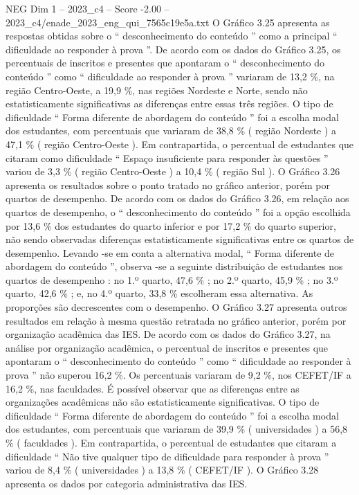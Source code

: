 \begin{textsample}{NEG Dim 1 – 2023\_c4 – Score -2.00 – 2023\_c4/enade\_2023\_eng\_qui\_7565c19e5a.txt}
O Gráfico 3.25 apresenta as respostas obtidas sobre o “ desconhecimento do conteúdo ” como a principal “ dificuldade ao responder à prova ”.
De acordo com os dados do Gráfico 3.25, os percentuais de inscritos e presentes que apontaram o “ desconhecimento do conteúdo ” como “ dificuldade ao responder à prova ” variaram de 13,2 \%, na região Centro-Oeste, a 19,9 \%, nas regiões Nordeste e Norte, sendo não estatisticamente significativas as diferenças entre essas três regiões.
O tipo de dificuldade “ Forma diferente de abordagem do conteúdo ” foi a escolha modal dos estudantes, com percentuais que variaram de 38,8 \% ( região Nordeste ) a 47,1 \% ( região Centro-Oeste ).
Em contrapartida, o percentual de estudantes que citaram como dificuldade “ Espaço insuficiente para responder às questões ” variou de 3,3 \% ( região Centro-Oeste ) a 10,4 \% ( região Sul ).
O Gráfico 3.26 apresenta os resultados sobre o ponto tratado no gráfico anterior, porém por quartos de desempenho.
De acordo com os dados do Gráfico 3.26, em relação aos quartos de desempenho, o “ desconhecimento do conteúdo ” foi a opção escolhida por 13,6 \% dos estudantes do quarto inferior e por 17,2 \% do quarto superior, não sendo observadas diferenças estatisticamente significativas entre os quartos de desempenho.
Levando -se em conta a alternativa modal, “ Forma diferente de abordagem do conteúdo ”, observa -se a seguinte distribuição de estudantes nos quartos de desempenho : no 1.º quarto, 47,6 \% ; no 2.º quarto, 45,9 \% ; no 3.º quarto, 42,6 \% ; e, no 4.º quarto, 33,8 \% escolheram essa alternativa.
As proporções são decrescentes com o desempenho.
O Gráfico 3.27 apresenta outros resultados em relação à mesma questão retratada no gráfico anterior, porém por organização acadêmica das IES.
De acordo com os dados do Gráfico 3.27, na análise por organização acadêmica, o percentual de inscritos e presentes que apontaram o “ desconhecimento do conteúdo ” como “ dificuldade ao responder à prova ” não superou 16,2 \%.
Os percentuais variaram de 9,2 \%, nos CEFET/IF a 16,2 \%, nas faculdades.
É possível observar que as diferenças entre as organizações acadêmicas não são estatisticamente significativas.
O tipo de dificuldade “ Forma diferente de abordagem do conteúdo ” foi a escolha modal dos estudantes, com percentuais que variaram de 39,9 \% ( universidades ) a 56,8 \% ( faculdades ).
Em contrapartida, o percentual de estudantes que citaram a dificuldade “ Não tive qualquer tipo de dificuldade para responder à prova ” variou de 8,4 \% ( universidades ) a 13,8 \% ( CEFET/IF ).
O Gráfico 3.28 apresenta os dados por categoria administrativa das IES.

\end{textsample}

